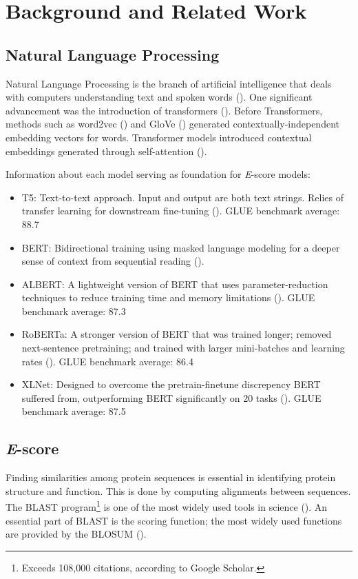 \chapter{Background and Related Work}

\section{Natural Language Processing}
Natural Language Processing is the branch of artificial intelligence that deals with computers understanding text and spoken words (\cite{Khurana:2023}). One significant advancement was the introduction of \glspl{transformer} (\cite{Vaswani:2017}). Before Transformers, methods such as word2vec (\cite{Mikolov:2013}) and GloVe (\cite{Pennington:2014}) generated contextually-independent embedding vectors for words. Transformer models introduced contextual embeddings generated through self-attention (\cite{Vaswani:2017}).

\noindent Information about each model serving as foundation for \textit{E}-score models:
\begin{itemize}
    \item{\gls{T5}: Text-to-text approach. Input and output are both text strings. Relies of transfer learning for downstream fine-tuning (\cite{Raffel:2020}). GLUE benchmark average: 88.7}
    \item{\gls{BERT}: Bidirectional training using masked language modeling for a deeper sense of context from sequential reading (\cite{Devlin:2018}).}
    \item{\gls{ALBERT}: A lightweight version of BERT that uses parameter-reduction techniques to reduce training time and memory limitations (\cite{Zhenzhong:2020}). GLUE benchmark average: 87.3}
    \item{\gls{RoBERTa}: A stronger version of BERT that was trained longer; removed next-sentence pretraining; and trained with larger mini-batches and learning rates (\cite{Liu:2019}). GLUE benchmark average: 86.4}
    \item{XLNet: Designed to overcome the pretrain-finetune discrepency BERT suffered from, outperforming BERT significantly on 20 tasks (\cite{Yang:2022}). GLUE benchmark average: 87.5}
\end{itemize}

\section{\textit{E}-score}
Finding similarities among protein sequences is essential in identifying protein structure and function. This is done by computing alignments between sequences. The \gls{BLAST} program\footnote{Exceeds 108,000 citations, according to Google Scholar.} is one of the most widely used tools in science (\cite{Atschul:1990}). An essential part of BLAST is the scoring function; the most widely used functions are provided by the \gls{BLOSUM} (\cite{Henikoff:1992}).


